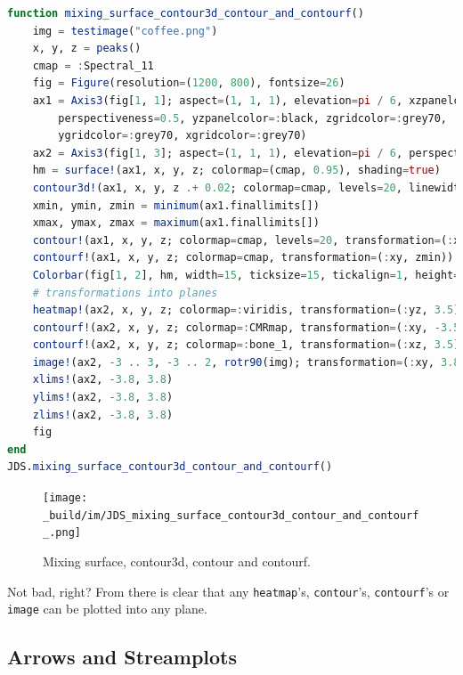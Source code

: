 \documentclass[
  notoc %
]{tufte-book}
\newcommand{\passthrough}[1]{#1}
\begin{document}
\begin{lstlisting}[language=Julia]
function mixing_surface_contour3d_contour_and_contourf()
    img = testimage("coffee.png")
    x, y, z = peaks()
    cmap = :Spectral_11
    fig = Figure(resolution=(1200, 800), fontsize=26)
    ax1 = Axis3(fig[1, 1]; aspect=(1, 1, 1), elevation=pi / 6, xzpanelcolor=(:black, 0.75),
        perspectiveness=0.5, yzpanelcolor=:black, zgridcolor=:grey70,
        ygridcolor=:grey70, xgridcolor=:grey70)
    ax2 = Axis3(fig[1, 3]; aspect=(1, 1, 1), elevation=pi / 6, perspectiveness=0.5)
    hm = surface!(ax1, x, y, z; colormap=(cmap, 0.95), shading=true)
    contour3d!(ax1, x, y, z .+ 0.02; colormap=cmap, levels=20, linewidth=2)
    xmin, ymin, zmin = minimum(ax1.finallimits[])
    xmax, ymax, zmax = maximum(ax1.finallimits[])
    contour!(ax1, x, y, z; colormap=cmap, levels=20, transformation=(:xy, zmax))
    contourf!(ax1, x, y, z; colormap=cmap, transformation=(:xy, zmin))
    Colorbar(fig[1, 2], hm, width=15, ticksize=15, tickalign=1, height=Relative(0.35))
    # transformations into planes
    heatmap!(ax2, x, y, z; colormap=:viridis, transformation=(:yz, 3.5))
    contourf!(ax2, x, y, z; colormap=:CMRmap, transformation=(:xy, -3.5))
    contourf!(ax2, x, y, z; colormap=:bone_1, transformation=(:xz, 3.5))
    image!(ax2, -3 .. 3, -3 .. 2, rotr90(img); transformation=(:xy, 3.8))
    xlims!(ax2, -3.8, 3.8)
    ylims!(ax2, -3.8, 3.8)
    zlims!(ax2, -3.8, 3.8)
    fig
end
JDS.mixing_surface_contour3d_contour_and_contourf()
\end{lstlisting}

\begin{figure}
\hypertarget{fig:mixing_surface_contour3d_contour_and_contourf}{%
\centering
\texttt{[image: \_build/im/JDS\_mixing\_surface\_contour3d\_contour\_and\_contourf\_.png]}
\caption{Mixing surface, contour3d, contour and
contourf.}\label{fig:mixing_surface_contour3d_contour_and_contourf}
}
\end{figure}

Not bad, right? From there is clear that any
\passthrough{\lstinline!heatmap!}'s,
\passthrough{\lstinline!contour!}'s,
\passthrough{\lstinline!contourf!}'s or \passthrough{\lstinline!image!}
can be plotted into any plane.

\hypertarget{arrows-and-streamplots}{%
\subsection{Arrows and Streamplots}\label{arrows-and-streamplots}}
\end{document}
